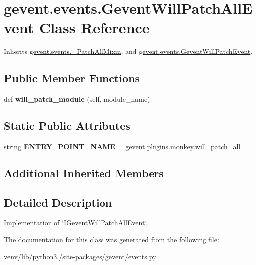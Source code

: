 \hypertarget{classgevent_1_1events_1_1_gevent_will_patch_all_event}{}\section{gevent.\+events.\+Gevent\+Will\+Patch\+All\+Event Class Reference}
\label{classgevent_1_1events_1_1_gevent_will_patch_all_event}


Inherits \hyperlink{classgevent_1_1events_1_1___patch_all_mixin}{gevent.\+events.\+\_\+\+Patch\+All\+Mixin}, and \hyperlink{classgevent_1_1events_1_1_gevent_will_patch_event}{gevent.\+events.\+Gevent\+Will\+Patch\+Event}.

\subsection*{Public Member Functions}
\begin{DoxyCompactItemize}
\item 
\mbox{\label{classgevent_1_1events_1_1_gevent_will_patch_all_event_a57a05bd82dcf515b15c3c87c0d7d8038}} 
def {\bfseries will\+\_\+patch\+\_\+module} (self, module\+\_\+name)
\end{DoxyCompactItemize}
\subsection*{Static Public Attributes}
\begin{DoxyCompactItemize}
\item 
\mbox{\label{classgevent_1_1events_1_1_gevent_will_patch_all_event_a99a5fa83bb6dd34c66733241a866c637}} 
string {\bfseries E\+N\+T\+R\+Y\+\_\+\+P\+O\+I\+N\+T\+\_\+\+N\+A\+ME} = \textquotesingle{}gevent.\+plugins.\+monkey.\+will\+\_\+patch\+\_\+all\textquotesingle{}
\end{DoxyCompactItemize}
\subsection*{Additional Inherited Members}


\subsection{Detailed Description}
\begin{DoxyVerb}Implementation of `IGeventWillPatchAllEvent`.
\end{DoxyVerb}
 

The documentation for this class was generated from the following file\+:\begin{DoxyCompactItemize}
\item 
venv/lib/python3./site-\/packages/gevent/events.\+py\end{DoxyCompactItemize}

